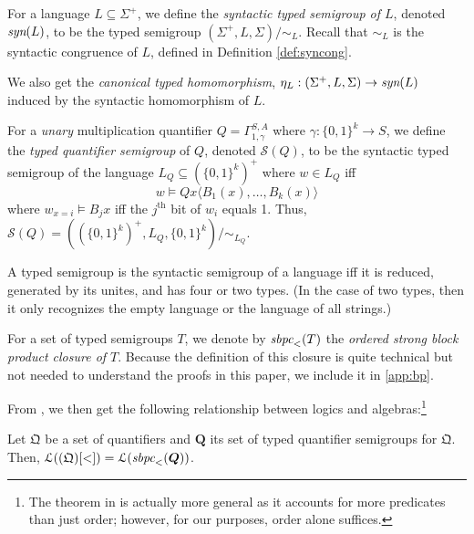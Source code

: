 \documentclass[a4paper,UKenglish,cleveref, autoref, thm-restate, anonymous]{lipics-v2021}
\begin{document}
\begin{definition}
    For a language $L \subseteq \Sigma^+$, we define the \emph{syntactic typed semigroup of $L$}, denoted $\emph{syn}(L)$, to be the typed semigroup $(\Sigma^+, L, \Sigma)/{\sim_L}$. Recall that ${\sim_L}$ is the syntactic congruence of $L$, defined in Definition \ref{def:syncong}.

    We also get the \emph{canonical typed homomorphism}, $\eta_L : (\Sigma^+, L, \Sigma) \rightarrow \emph{syn}(L)$ induced by the syntactic homomorphism of $L$.
\end{definition} 


\begin{definition}\label{def:origtypedquantsemi}
    For a \emph{unary} multiplication quantifier $Q = \Gamma^{S,A}_{1,\gamma}$ where $\gamma : \{0,1\}^k \rightarrow S$, we define the \emph{typed quantifier semigroup} of $Q$, denoted $\mathcal{S}(Q)$, to be the syntactic typed semigroup of the language $L_Q \subseteq (\{0,1\}^k)^+$ where $w \in L_Q$ iff \[
        w \models Q x \langle B_1(x), \dots, B_k(x) \rangle
    \] where $w_{x=i} \models B_jx$ iff the $j^{\text{th}}$ bit of $w_i$ equals 1. Thus, $\mathcal{S}(Q) = ((\{0,1\}^k)^+, L_Q, \{0,1\}^k) / {\sim_{L_Q}}$.
\end{definition}

\begin{proposition}
    A typed semigroup is the syntactic semigroup of a language iff it is reduced, generated by its unites, and has four or two types. (In the case of two types, then it only recognizes the empty language or the language of all strings.)
\end{proposition}

\begin{definition}
    For a set of typed semigroups $T$, we denote by $\emph{sbpc}_<(T)$ the \emph{ordered strong block product closure of $T$}. Because the definition of this closure is quite technical but not needed to understand the proofs in this paper, we include it in \autoref{app:bp}.
\end{definition}

From \cite[Theorem 4.14]{krebs2008typed}, we then get the following relationship between logics and algebras:\footnote{The theorem in \cite{krebs2008typed} is actually more general as it accounts for more predicates than just order; however, for our purposes, order alone suffices.}
\begin{theorem}\label{thm:logcircalgequiv}
    Let $\mathfrak{Q}$ be a set of quantifiers and $\bm{Q}$ its set of typed quantifier semigroups for $\mathfrak{Q}$. Then, \(
        \mathcal{L}((\mathfrak{Q})[<]) = \mathcal{L}(\emph{sbpc}_<(\bm{Q}))
    \).
\end{theorem}
\iffalse
TODO: remove comments before submission if not needed
Then, via \cite[Corollary 5.13]{krebs2008typed}, we obtain an algebraic characterization of \textsc{DLogTime}-uniform TC${}^0$:
\begin{corollary}\label{cor:algfortc0}
    \(\textsc{DLogTime}\emph{-uniform}\ \emph{TC}^0 = \mathcal{L}(\emph{sbpc}_<(\{(\mathbb{Z}, \mathbb{Z}^+, \pm 1), (\mathbb{N}, \mathbb{S}, \{0,1\})\}))\)
\end{corollary}
\fi
\end{document}

